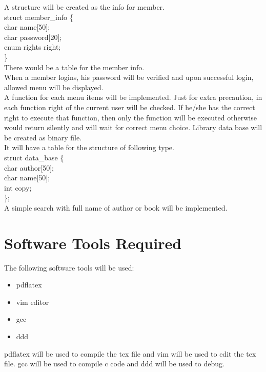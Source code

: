 \documentclass[a4paper,10pt]{report} %
\begin{document}
	A structure will be created as the info for member.\\
	struct member\_info \{\\
		char name[50];\\
		char password[20];\\
		enum rights right;\\
	\}\\
	There would be a table for the member info.\\
	When a member logins, his password will be verified and upon
successful login, allowed menu will be displayed.\\
	A function for each menu items will be implemented. Just for
extra precaution, in each function right of the current user will be
checked. If he/she has the correct right to execute that function, then
only the function will be executed otherwise would return silently and
will wait for correct menu choice.
	Library data base will be created as binary file.\\
	It will have a table for the structure of following type.\\
	struct data\_base \{\\
		char author[50];\\
		char name[50];\\
		int copy;\\
	\};\\
	A simple search with full name of author or book will be
implemented.

    \section{Software Tools Required}
    The following software tools will be used:
    \begin{itemize}
    \item pdflatex
    \item vim editor
    \item gcc
    \item ddd
    \end{itemize}
    pdflatex will be used to compile the tex file and vim will be used to edit
    the tex file.
    gcc will be used to compile c code and ddd will be used to debug.
    
\end{document}

